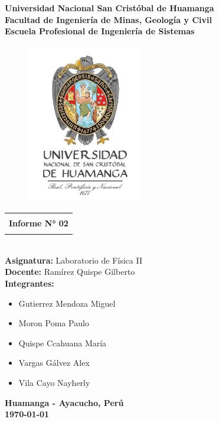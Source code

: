 \begin{titlepage}
	\begin{center}
		{\LARGE\textbf{Universidad Nacional San Cristóbal de Huamanga}}\\
		{\LARGE\textbf{Facultad de Ingeniería de Minas, Geología y Civil}}\\
		{\LARGE\textbf{Escuela Profesional de Ingeniería de Sistemas}}\\
		\vspace{1cm}
		\begin{figure}[h]
			\centering
			\includegraphics[width=5cm, height=7cm]{imagenes/logo.jpg}
		\end{figure}
		\vspace{0.5cm}
		\begin{tabular}{|c|}
			\hline
			\\
			{\Large\textbf{ Informe N° 02  }}\\
			\\
			\hline
		\end{tabular}\\
		\vspace{0.5cm}
		{\Large\textbf{Asignatura: } Laboratorio de Física II}\\
		{\Large\textbf{Docente: } Ramírez Quispe Gilberto}\\
		{\Large\textbf{Integrantes: }}\\
		\begin{itemize}
			\centering
			\item {\Large Gutierrez Mendoza Miguel}
			\item {\Large Moron Poma Paulo}
			\item {\Large Quispe Ccahuana María}
			\item {\Large Vargas Gálvez Alex} 
			\item {\Large Vila Cayo Nayherly}
		\end{itemize}
		\vspace{2cm}
		{\huge \textbf{Huamanga - Ayacucho, Perú}}\\
		\vspace{0.5cm}
		{\huge \textbf{\today}}
	\end{center}
\end{titlepage}

